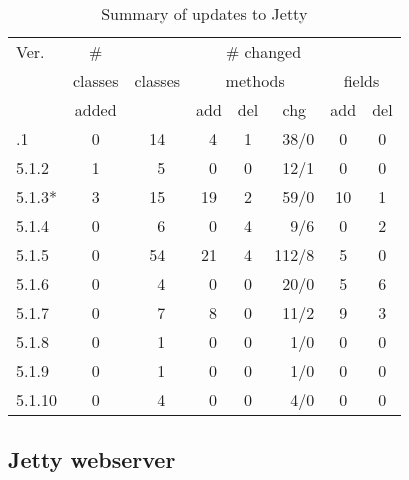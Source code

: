 
\newcommand{\ChangedClassesColumn}{third}
\begin{table}
\begin{footnotesize}
\begin{center}
\begin{tabular}{|l||c||c|c|c|r|c|c|} \hline \T
Ver.    & \#      & \multicolumn{6}{c|}{\# changed} \\
        & classes & \multicolumn{1}{c|}{classes} & \multicolumn{3}{c|}{methods} & \multicolumn{2}{c|}{fields} \\
        & added   &         & add & del & \multicolumn{1}{c|}{chg}             & add & del \\ \hline \hline \T
5.1.1   & 0       & 14      &\ 4  & 1   &  38/0            &  0  & 0   \\
5.1.2   & 1       &\ 5      &\ 0  & 0   &  12/1            &  0  & 0   \\
5.1.3*  & 3       & 15      & 19  & 2   &  59/0            & 10  & 1   \\
5.1.4   & 0       &\ 6      &\ 0  & 4   &   9/6            &  0  & 2   \\
5.1.5   & 0       & 54      & 21  & 4   & 112/8            &  5  & 0   \\
5.1.6   & 0       &\ 4      &\ 0  & 0   &  20/0            &  5  & 6   \\
5.1.7   & 0       &\ 7      &\ 8  & 0   &  11/2            &  9  & 3   \\
5.1.8   & 0       &\ 1      &\ 0  & 0   &   1/0            &  0  & 0   \\
5.1.9   & 0       &\ 1      &\ 0  & 0   &   1/0            &  0  & 0   \\
5.1.10  & 0       &\ 4      &\ 0  & 0   &   4/0            &  0  & 0   \\ \hline
\end{tabular}
\end{center}
\end{footnotesize}
\caption{Summary of updates to Jetty}
\label{tab:jetty-changes}
\end{table}

\subsection{Jetty webserver}
\label{subsec:jetty}

